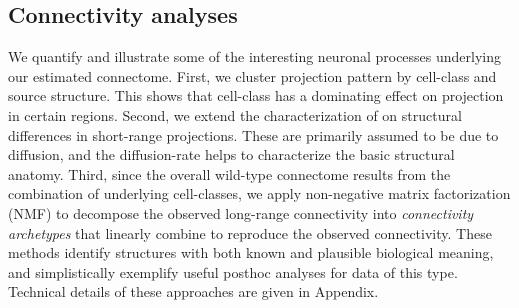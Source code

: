 
\subsection{Connectivity analyses}

We quantify and illustrate some of the interesting neuronal processes underlying our estimated connectome.
First, we cluster projection pattern by cell-class and source structure.
This shows that cell-class has a dominating effect on projection in certain regions.
Second, we extend the characterization of \citet{Knox2019-ot} on structural differences in short-range projections.
These are primarily assumed to be due to diffusion, and the diffusion-rate helps to characterize the basic structural anatomy.
Third, since the overall wild-type connectome results from the combination of underlying cell-classes, we apply non-negative matrix factorization (NMF) to decompose the observed long-range connectivity into \textit{connectivity archetypes} that linearly combine to reproduce the observed connectivity.
These methods identify structures with both known and plausible biological meaning, and simplistically exemplify useful posthoc analyses for data of this type.
Technical details of these approaches are given in Appendix.




